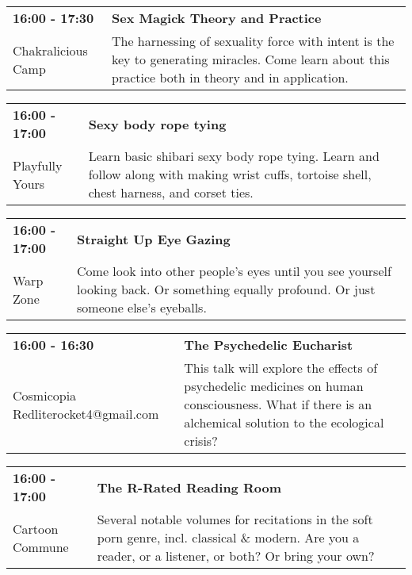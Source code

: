 \begin{tabular}{ p{1in} p{2.2in} }
    \textbf{16:00 - 17:30} & \textbf{Sex Magick Theory and Practice} \\
    Chakralicious Camp \newline  & The harnessing of sexuality force with intent is the key to generating miracles. Come learn about this practice both in theory and in application. \\
    \hline 
\end{tabular}
    
\begin{tabular}{ p{1in} p{2.2in} }
    \textbf{16:00 - 17:00} & \textbf{Sexy body rope tying} \\
    Playfully Yours \newline  & Learn basic shibari sexy body rope tying. Learn and  follow along with making wrist cuffs, tortoise shell, chest harness, and corset ties. \\
    \hline 
\end{tabular}
    
\begin{tabular}{ p{1in} p{2.2in} }
    \textbf{16:00 - 17:00} & \textbf{Straight Up Eye Gazing} \\
    Warp Zone \newline  & Come look into other people's eyes until you see yourself looking back. Or something equally profound. Or just someone else's eyeballs. \\
    \hline 
\end{tabular}
    
\begin{tabular}{ p{1in} p{2.2in} }
    \textbf{16:00 - 16:30} & \textbf{The Psychedelic Eucharist} \\
    Cosmicopia \newline Redliterocket4@gmail.com & This talk will explore the effects of psychedelic medicines on human consciousness. What if there is an alchemical solution to the ecological crisis? \\
    \hline 
\end{tabular}
    
\begin{tabular}{ p{1in} p{2.2in} }
    \textbf{16:00 - 17:00} & \textbf{The R-Rated Reading Room} \\
    Cartoon Commune \newline  & Several notable volumes for recitations in the soft porn genre, incl. classical \& modern. Are you a reader, or a listener, or both? Or bring your own? \\
    \hline 
\end{tabular}
    
